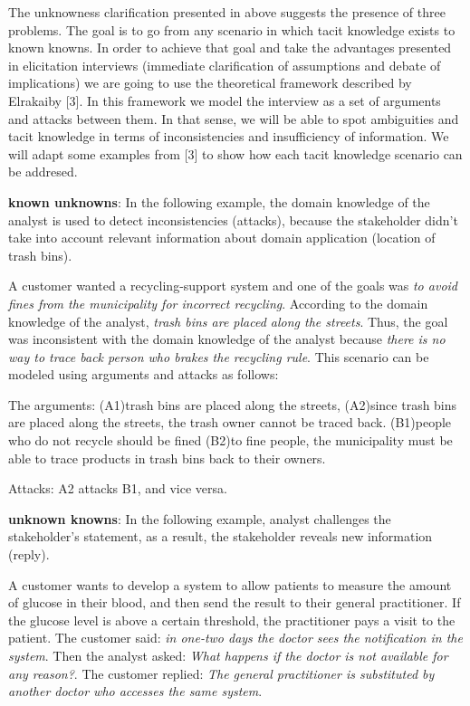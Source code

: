 \documentclass[]{llncs}
\begin{document}
The unknowness clarification presented in above suggests the presence of
three problems. The goal is to go from any scenario in which tacit
knowledge exists to known knowns. In order to achieve that goal and take
the advantages presented in elicitation interviews (immediate
clarification of assumptions and debate of implications) we are going to
use the theoretical framework described by Elrakaiby {[}3{]}. In this
framework we model the interview as a set of arguments and attacks
between them. In that sense, we will be able to spot ambiguities and
tacit knowledge in terms of inconsistencies and insufficiency of
information. We will adapt some examples from {[}3{]} to show how each
tacit knowledge scenario can be addresed.

\textbf{known unknowns}: In the following example, the domain knowledge
of the analyst is used to detect inconsistencies (attacks), because the
stakeholder didn't take into account relevant information about domain
application (location of trash bins).

A customer wanted a recycling-support system and one of the goals was
\emph{to avoid fines from the municipality for incorrect recycling}.
According to the domain knowledge of the analyst, \emph{trash bins are
placed along the streets}. Thus, the goal was inconsistent with the
domain knowledge of the analyst because \emph{there is no way to trace
back person who brakes the recycling rule}. This scenario can be modeled
using arguments and attacks as follows:

The arguments: (A1)trash bins are placed along the streets, (A2)since
trash bins are placed along the streets, the trash owner cannot be
traced back. (B1)people who do not recycle should be fined (B2)to fine
people, the municipality must be able to trace products in trash bins
back to their owners.

Attacks: A2 attacks B1, and vice versa.

\textbf{unknown knowns}: In the following example, analyst challenges
the stakeholder's statement, as a result, the stakeholder reveals new
information (reply).

A customer wants to develop a system to allow patients to measure the
amount of glucose in their blood, and then send the result to their
general practitioner. If the glucose level is above a certain threshold,
the practitioner pays a visit to the patient. The customer said:
\emph{in one-two days the doctor sees the notification in the system}.
Then the analyst asked: \emph{What happens if the doctor is not
available for any reason?}. The customer replied: \emph{The general
practitioner is substituted by another doctor who accesses the same
system}.
\end{document}
